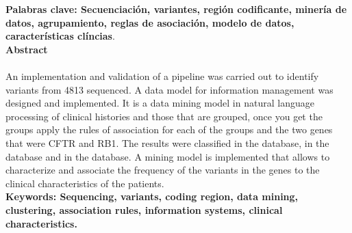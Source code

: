 \textbf{\small Palabras clave: Secuenciación, variantes, región codificante, minería de datos, agrupamiento, reglas de asociación, modelo de datos, características clíncias}.\\


\textbf{\LARGE Abstract}\\\\
An implementation and validation of a pipeline was carried out to identify variants from 4813 sequenced. A data model for information management was designed and implemented. It is a data mining model in natural language processing of clinical histories and those that are grouped, once you get the groups apply the rules of association for each of the groups and the two genes that were  CFTR and RB1. The results were classified in the database, in the database and in the database. A mining model is implemented that allows to characterize and associate the frequency of the variants in the genes to the clinical characteristics of the patients.\\[2.0cm]
\textbf{\small Keywords: Sequencing, variants, coding region, data mining, clustering, association rules, information systems, clinical characteristics.}\\